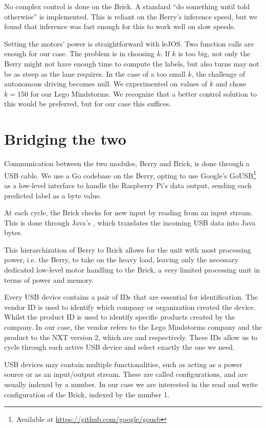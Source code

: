 No complex control is done on the Brick. A standard ``do something until told otherwise'' is
implemented. This is reliant on the Berry's inference speed, but we found that inference was fast
enough for this to work well on slow speeds.

Setting the motors' power is straightforward with leJOS. Two function calls are enough for our
case. The problem is in choosing $k$. If $k$ is too big, not only the Berry might not have enough
time to compute the labels, but also turns may not be as steep as the lane requires. In the case of
a too small $k$, the challenge of autonomous driving becomes null. We experimented on values of $k$
and chose $k=150$ for our Lego Mindstorms. We recognize that a better control solution to this
would be preferred, but for our case this suffices.

\section{Bridging the two}

Communication between the two modules, Berry and Brick, is done through a USB cable. We use a Go
codebase on the Berry, opting to use Google's GoUSB\footnote{Available at
\url{https://github.com/google/gousb}} as a low-level interface to handle the Raspberry Pi's data
output, sending each predicted label as a byte value.

At each cycle, the Brick checks for new input by reading from an input stream. This is done through
Java's , which translates the incoming USB data into Java bytes.

This hierarchization of Berry to Brick allows for the unit with most processing power, i.e.  the
Berry, to take on the heavy load, leaving only the necessary dedicated low-level motor handling to
the Brick, a very limited processing unit in terms of power and memory.

Every USB device contains a pair of IDs that are essential for identification. The vendor ID is
used to identify which company or organization created the device. Whilst the product ID is used to
identify specific products created by the company. In our case, the vendor refers to the Lego
Mindstorms company and the product to the NXT version 2, which are  and 
respectively.  These IDs allow us to cycle through each active USB device and select exactly the
one we need.

USB devices may contain multiple functionalities, such as acting as a power source or as an
input/output stream. These are called configurations, and are usually indexed by a number. In our
case we are interested in the read and write configuration of the Brick, indexed by the number 1.

